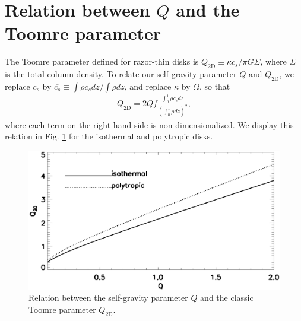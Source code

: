 \section{Relation between $Q$ and the Toomre parameter}\label{q3d2d}
The Toomre parameter defined for razor-thin disks is $Q_\mathrm{2D}\equiv \kappa c_s/\pi G
\Sigma$,  where $\Sigma$ is the total column density. To relate our
self-gravity parameter $Q$ and $Q_\mathrm{2D}$, we replace $c_s$ by
$\overline{c_s}\equiv\int\rho c_s dz/\int\rho dz$, and replace
$\kappa$ by $\Omega$, so that 
\begin{align}
  Q_\mathrm{2D} = 2Qf \frac{\int_0^1
    \rho c_s
    dz}{\left(\int_0^1 \rho dz\right)^2},   
\end{align}
where each term on the right-hand-side is non-dimensionalized. 
We display this relation in Fig. \ref{plot_q3d2d} for the isothermal and
polytropic disks. 

\begin{figure}
  \includegraphics[width=\linewidth]{figures/q2d_iso}
  \caption{Relation between the self-gravity parameter $Q$ and the
    classic Toomre parameter $Q_\mathrm{2D}$.   
    \label{plot_q3d2d}}
\end{figure}


